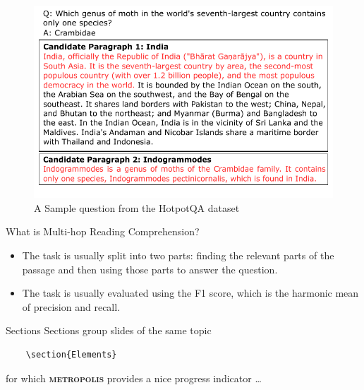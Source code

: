 \documentclass[10pt]{beamer}
\newcommand{\themename}{\textbf{\textsc{metropolis}}\xspace}
\begin{document}
\begin{frame}
  \begin{figure}[t] %
    \centering
    \includegraphics[width=\linewidth]{fig/fig_1_hotpot_example.pdf} %
    \caption{A Sample question from the HotpotQA dataset}
    \label{fig:sample_hotpotqa} %
  \end{figure}
\end{frame}

\begin{frame}[fragile]{What is Multi-hop Reading Comprehension?}

  \begin{itemize}
    \item The task is usually split into two parts: finding the relevant parts of the passage and then using those parts to answer the question.
    \item The task is usually evaluated using the F1 score, which is the harmonic mean of precision and recall.
    
  \end{itemize}
\end{frame}


\begin{frame}[fragile]{Sections}
  Sections group slides of the same topic

  \begin{verbatim}    \section{Elements}\end{verbatim}

  for which \themename provides a nice progress indicator \ldots
  
\end{frame}
\end{document}
